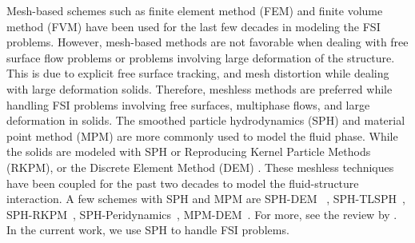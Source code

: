 \documentclass[10pt, conference]{FMFP2022}
\begin{document}
Mesh-based schemes such as finite element method (FEM)
\cite{lozovskiy2015unconditionally} and finite volume method (FVM)
\cite{jasak2007updated} have been used for the last few decades in modeling the
FSI problems. However, mesh-based methods are not favorable when dealing with
free surface flow problems or problems involving large deformation of the
structure. This is due to explicit free surface tracking, and mesh distortion
\cite{moresi2003lagrangian} while dealing with large deformation solids.
Therefore, meshless methods are preferred while handling FSI problems involving
free surfaces, multiphase flows, and large deformation in solids. The smoothed
particle hydrodynamics (SPH) and material point method (MPM) are more commonly
used to model the fluid phase. While the solids are modeled with SPH or
Reproducing Kernel Particle Methods (RKPM), or the Discrete Element Method (DEM)
\cite{hu2010material,li2022material}. These meshless techniques have been
coupled for the past two decades to model the fluid-structure interaction. A few
schemes with SPH and MPM are SPH-DEM~ \cite{wu2016coupled},
SPH-TLSPH~\cite{salehizadeh2022coupled}, SPH-RKPM~\cite{peng2021coupling},
SPH-Peridynamics~\cite{sun2020smoothed}, MPM-DEM~\cite{singer2022partitioned}.
For more, see the review by \cite{khayyer2022systematic}. In the current work,
we use SPH to handle FSI problems.
\end{document}
